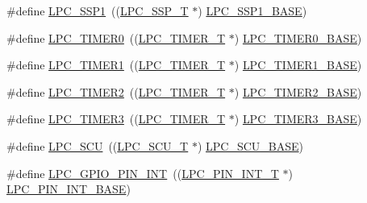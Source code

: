 \begin{DoxyCompactItemize}
\item 
\#define \hyperlink{group___p_e_r_i_p_h__43_x_x___b_a_s_e_ga09c4610ada1d9aa18913963cbd1a6e52}{L\+P\+C\+\_\+\+S\+S\+P1}~((\hyperlink{struct_l_p_c___s_s_p___t}{L\+P\+C\+\_\+\+S\+S\+P\+\_\+T}              $\ast$) \hyperlink{group___p_e_r_i_p_h__43_x_x___b_a_s_e_ga05d118997f53f596d3a087f8b91a1969}{L\+P\+C\+\_\+\+S\+S\+P1\+\_\+\+B\+A\+SE})
\item 
\#define \hyperlink{group___p_e_r_i_p_h__43_x_x___b_a_s_e_ga800f32a8a38d9e9c8f3b6ab161f6f2d2}{L\+P\+C\+\_\+\+T\+I\+M\+E\+R0}~((\hyperlink{struct_l_p_c___t_i_m_e_r___t}{L\+P\+C\+\_\+\+T\+I\+M\+E\+R\+\_\+T}            $\ast$) \hyperlink{group___p_e_r_i_p_h__43_x_x___b_a_s_e_ga58d2cc2a6a4bd9319853ad5b62a20d43}{L\+P\+C\+\_\+\+T\+I\+M\+E\+R0\+\_\+\+B\+A\+SE})
\item 
\#define \hyperlink{group___p_e_r_i_p_h__43_x_x___b_a_s_e_ga0d28200f11e877cece24025ebe7fe72a}{L\+P\+C\+\_\+\+T\+I\+M\+E\+R1}~((\hyperlink{struct_l_p_c___t_i_m_e_r___t}{L\+P\+C\+\_\+\+T\+I\+M\+E\+R\+\_\+T}            $\ast$) \hyperlink{group___p_e_r_i_p_h__43_x_x___b_a_s_e_ga077e94a95d95d79f6aeb0ea962377c46}{L\+P\+C\+\_\+\+T\+I\+M\+E\+R1\+\_\+\+B\+A\+SE})
\item 
\#define \hyperlink{group___p_e_r_i_p_h__43_x_x___b_a_s_e_gae0a3c421e7e1ac3ffd7e740e33387dc5}{L\+P\+C\+\_\+\+T\+I\+M\+E\+R2}~((\hyperlink{struct_l_p_c___t_i_m_e_r___t}{L\+P\+C\+\_\+\+T\+I\+M\+E\+R\+\_\+T}            $\ast$) \hyperlink{group___p_e_r_i_p_h__43_x_x___b_a_s_e_gab46122134a159b494e060ae3a7be0967}{L\+P\+C\+\_\+\+T\+I\+M\+E\+R2\+\_\+\+B\+A\+SE})
\item 
\#define \hyperlink{group___p_e_r_i_p_h__43_x_x___b_a_s_e_gab34ae64ea250497b5148b7ffb61d04f5}{L\+P\+C\+\_\+\+T\+I\+M\+E\+R3}~((\hyperlink{struct_l_p_c___t_i_m_e_r___t}{L\+P\+C\+\_\+\+T\+I\+M\+E\+R\+\_\+T}            $\ast$) \hyperlink{group___p_e_r_i_p_h__43_x_x___b_a_s_e_ga002e95d51eef32473052ea2575440eac}{L\+P\+C\+\_\+\+T\+I\+M\+E\+R3\+\_\+\+B\+A\+SE})
\item 
\#define \hyperlink{group___p_e_r_i_p_h__43_x_x___b_a_s_e_ga95e2a586609fde90e5ff88298208f269}{L\+P\+C\+\_\+\+S\+CU}~((\hyperlink{struct_l_p_c___s_c_u___t}{L\+P\+C\+\_\+\+S\+C\+U\+\_\+T}              $\ast$) \hyperlink{group___p_e_r_i_p_h__43_x_x___b_a_s_e_gacd777eafbfcbc5701c9728c9261b1bd1}{L\+P\+C\+\_\+\+S\+C\+U\+\_\+\+B\+A\+SE})
\item 
\#define \hyperlink{group___p_e_r_i_p_h__43_x_x___b_a_s_e_gaa58960983d95c688cd33ff8ca91f99f3}{L\+P\+C\+\_\+\+G\+P\+I\+O\+\_\+\+P\+I\+N\+\_\+\+I\+NT}~((\hyperlink{struct_l_p_c___p_i_n___i_n_t___t}{L\+P\+C\+\_\+\+P\+I\+N\+\_\+\+I\+N\+T\+\_\+T}          $\ast$) \hyperlink{group___p_e_r_i_p_h__43_x_x___b_a_s_e_ga4941871b3be823925361fe29e1d7721f}{L\+P\+C\+\_\+\+P\+I\+N\+\_\+\+I\+N\+T\+\_\+\+B\+A\+SE})

\end{DoxyCompactItemize}
